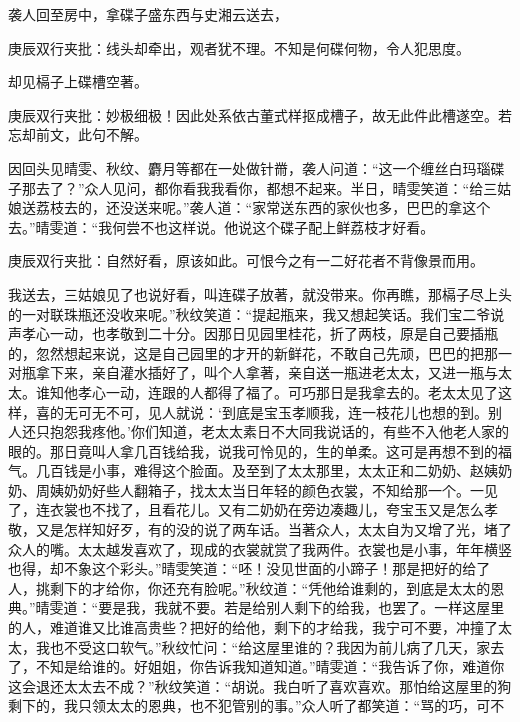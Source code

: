 \begin{parag}
    袭人回至房中，拿碟子盛东西与史湘云送去，\begin{note}庚辰双行夹批：线头却牵出，观者犹不理。不知是何碟何物，令人犯思度。\end{note}却见槅子上碟槽空著。\begin{note}庚辰双行夹批：妙极细极！因此处系依古董式样抠成槽子，故无此件此槽遂空。若忘却前文，此句不解。\end{note}因回头见晴雯、秋纹、麝月等都在一处做针黹，袭人问道：“这一个缠丝白玛瑙碟子那去了？”众人见问，都你看我我看你，都想不起来。半日，晴雯笑道：“给三姑娘送荔枝去的，还没送来呢。”袭人道：“家常送东西的家伙也多，巴巴的拿这个去。”晴雯道：“我何尝不也这样说。他说这个碟子配上鲜荔枝才好看。\begin{note}庚辰双行夹批：自然好看，原该如此。可恨今之有一二好花者不背像景而用。\end{note}我送去，三姑娘见了也说好看，叫连碟子放著，就没带来。你再瞧，那槅子尽上头的一对联珠瓶还没收来呢。”秋纹笑道：“提起瓶来，我又想起笑话。我们宝二爷说声孝心一动，也孝敬到二十分。因那日见园里桂花，折了两枝，原是自己要插瓶的，忽然想起来说，这是自己园里的才开的新鲜花，不敢自己先顽，巴巴的把那一对瓶拿下来，亲自灌水插好了，叫个人拿著，亲自送一瓶进老太太，又进一瓶与太太。谁知他孝心一动，连跟的人都得了福了。可巧那日是我拿去的。老太太见了这样，喜的无可无不可，见人就说：‘到底是宝玉孝顺我，连一枝花儿也想的到。别人还只抱怨我疼他。’你们知道，老太太素日不大同我说话的，有些不入他老人家的眼的。那日竟叫人拿几百钱给我，说我可怜见的，生的单柔。这可是再想不到的福气。几百钱是小事，难得这个脸面。及至到了太太那里，太太正和二奶奶、赵姨奶奶、周姨奶奶好些人翻箱子，找太太当日年轻的颜色衣裳，不知给那一个。一见了，连衣裳也不找了，且看花儿。又有二奶奶在旁边凑趣儿，夸宝玉又是怎么孝敬，又是怎样知好歹，有的没的说了两车话。当著众人，太太自为又增了光，堵了众人的嘴。太太越发喜欢了，现成的衣裳就赏了我两件。衣裳也是小事，年年横竖也得，却不象这个彩头。”晴雯笑道：“呸！没见世面的小蹄子！那是把好的给了人，挑剩下的才给你，你还充有脸呢。”秋纹道：“凭他给谁剩的，到底是太太的恩典。”晴雯道：“要是我，我就不要。若是给别人剩下的给我，也罢了。一样这屋里的人，难道谁又比谁高贵些？把好的给他，剩下的才给我，我宁可不要，冲撞了太太，我也不受这口软气。”秋纹忙问：“给这屋里谁的？我因为前儿病了几天，家去了，不知是给谁的。好姐姐，你告诉我知道知道。”晴雯道：“我告诉了你，难道你这会退还太太去不成？”秋纹笑道：“胡说。我白听了喜欢喜欢。那怕给这屋里的狗剩下的，我只领太太的恩典，也不犯管别的事。”众人听了都笑道：“骂的巧，可不
\end{parag}
